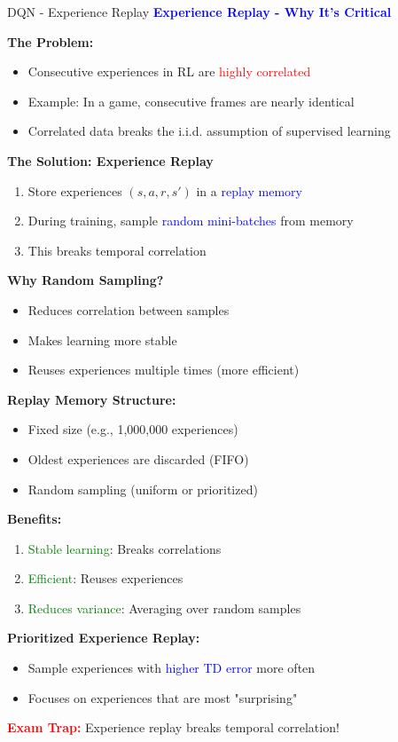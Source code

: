 \documentclass[8pt]{beamer}
\begin{document}
\begin{frame}{DQN - Experience Replay}
\fontsize{6.5}{7.5}\selectfont
\textcolor{blue}{\textbf{Experience Replay - Why It's Critical}}

\textbf{The Problem:}
\begin{itemize}
\item Consecutive experiences in RL are \textcolor{red}{highly correlated}
\item Example: In a game, consecutive frames are nearly identical
\item Correlated data breaks the i.i.d. assumption of supervised learning
\end{itemize}

\textbf{The Solution: Experience Replay}
\begin{enumerate}
\item Store experiences $(s, a, r, s')$ in a \textcolor{blue}{replay memory}
\item During training, sample \textcolor{blue}{random mini-batches} from memory
\item This breaks temporal correlation
\end{enumerate}

\textbf{Why Random Sampling?}
\begin{itemize}
\item Reduces correlation between samples
\item Makes learning more stable
\item Reuses experiences multiple times (more efficient)
\end{itemize}

\textbf{Replay Memory Structure:}
\begin{itemize}
\item Fixed size (e.g., 1,000,000 experiences)
\item Oldest experiences are discarded (FIFO)
\item Random sampling (uniform or prioritized)
\end{itemize}

\textbf{Benefits:}
\begin{enumerate}
\item \textcolor{green}{Stable learning}: Breaks correlations
\item \textcolor{green}{Efficient}: Reuses experiences
\item \textcolor{green}{Reduces variance}: Averaging over random samples
\end{enumerate}

\textbf{Prioritized Experience Replay:}
\begin{itemize}
\item Sample experiences with \textcolor{blue}{higher TD error} more often
\item Focuses on experiences that are most "surprising"
\end{itemize}

\textcolor{red}{\textbf{Exam Trap:}} Experience replay breaks temporal correlation!
\end{frame}
\end{document}
